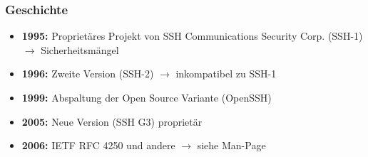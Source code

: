 \begin{frame}
\frametitle{Geschichte}
\begin{itemize}
\item \textbf{1995:}  Proprietäres Projekt von SSH Communications Security Corp. (SSH-1) $\rightarrow$ Sicherheitsmängel
\pause
\item \textbf{1996:} Zweite Version (SSH-2) $\rightarrow$ inkompatibel zu SSH-1
\pause
\item \textbf{1999:} Abspaltung der Open Source Variante (OpenSSH)
\pause
\item \textbf{2005:} Neue Version (SSH G3) proprietär
\pause
\item \textbf{2006:} IETF RFC 4250 und andere $\rightarrow$ siehe Man-Page
\end{itemize}
\end{frame}